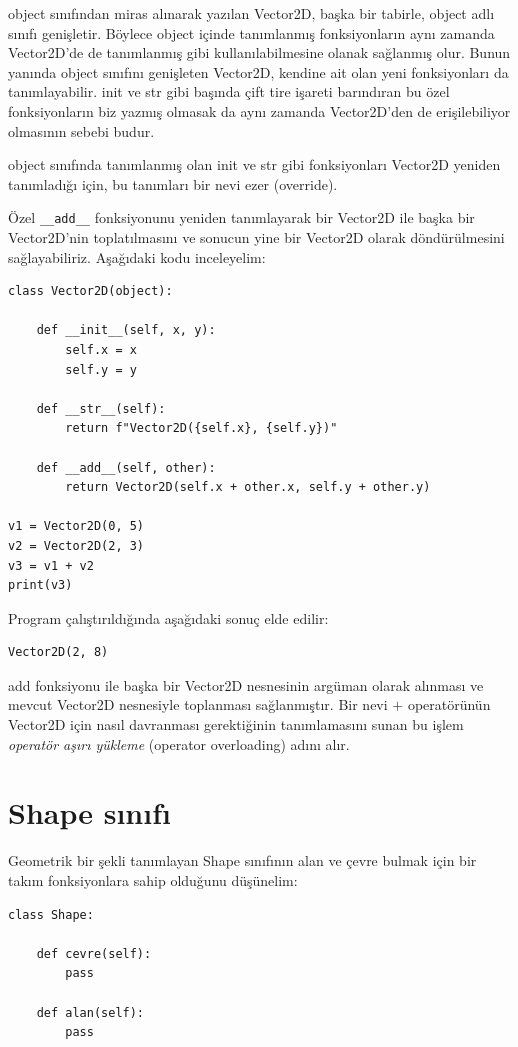 \documentclass[12pt]{report}
\begin{document}
object sınıfından miras alınarak yazılan Vector2D, başka bir tabirle, object adlı sınıfı genişletir. Böylece object içinde tanımlanmış fonksiyonların aynı zamanda Vector2D'de de tanımlanmış gibi kullanılabilmesine olanak sağlanmış olur. Bunun yanında object sınıfını genişleten Vector2D, kendine ait olan yeni fonksiyonları da tanımlayabilir. init ve str gibi başında çift tire işareti barındıran bu özel fonksiyonların biz yazmış olmasak da aynı zamanda Vector2D'den de erişilebiliyor olmasının sebebi budur. 

object sınıfında tanımlanmış olan init ve str gibi fonksiyonları Vector2D yeniden tanımladığı için, bu tanımları bir nevi ezer (override).

Özel \texttt{\_\_add\_\_} fonksiyonunu yeniden tanımlayarak bir Vector2D ile başka bir Vector2D'nin toplatılmasını ve sonucun yine bir Vector2D olarak döndürülmesini sağlayabiliriz. Aşağıdaki kodu inceleyelim:


\begin{Verbatim}[frame = single]
class Vector2D(object):

	def __init__(self, x, y):
		self.x = x
		self.y = y
	
	def __str__(self):
		return f"Vector2D({self.x}, {self.y})"
	
	def __add__(self, other):
		return Vector2D(self.x + other.x, self.y + other.y)

v1 = Vector2D(0, 5)
v2 = Vector2D(2, 3)
v3 = v1 + v2
print(v3)
\end{Verbatim}


Program çalıştırıldığında aşağıdaki sonuç elde edilir:
\begin{Verbatim}[frame = single]
Vector2D(2, 8)
\end{Verbatim}

add fonksiyonu ile başka bir Vector2D nesnesinin argüman olarak alınması ve mevcut Vector2D nesnesiyle toplanması sağlanmıştır. Bir nevi $+$ operatörünün Vector2D için nasıl davranması gerektiğinin tanımlamasını sunan bu işlem \textit{operatör aşırı yükleme} (operator overloading) adını alır.

\pagebreak
\section{Shape sınıfı}
Geometrik bir şekli tanımlayan Shape sınıfının alan ve çevre bulmak için bir takım fonksiyonlara sahip olduğunu düşünelim:

\begin{Verbatim}[frame = single]
class Shape:

	def cevre(self):
		pass
	
	def alan(self):
		pass
\end{Verbatim}
\end{document}

